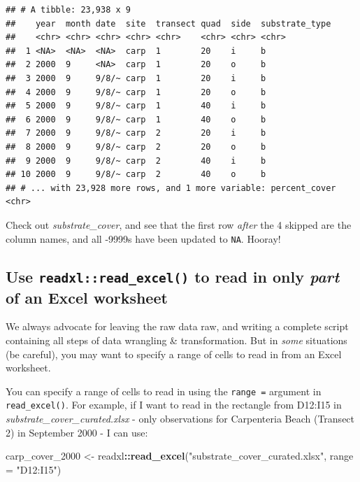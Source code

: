 \documentclass[]{book}
\newenvironment{Shaded}{\begin{snugshade}}{\end{snugshade}}
\newcommand{\DataTypeTok}[1]{\textcolor[rgb]{0.13,0.29,0.53}{#1}}
\newcommand{\DecValTok}[1]{\textcolor[rgb]{0.00,0.00,0.81}{#1}}
\newcommand{\KeywordTok}[1]{\textcolor[rgb]{0.13,0.29,0.53}{\textbf{#1}}}
\newcommand{\NormalTok}[1]{#1}
\newcommand{\OperatorTok}[1]{\textcolor[rgb]{0.81,0.36,0.00}{\textbf{#1}}}
\newcommand{\StringTok}[1]{\textcolor[rgb]{0.31,0.60,0.02}{#1}}
\begin{document}
\begin{verbatim}
## # A tibble: 23,938 x 9
##    year  month date  site  transect quad  side  substrate_type
##    <chr> <chr> <chr> <chr> <chr>    <chr> <chr> <chr>         
##  1 <NA>  <NA>  <NA>  carp  1        20    i     b             
##  2 2000  9     <NA>  carp  1        20    o     b             
##  3 2000  9     9/8/~ carp  1        20    i     b             
##  4 2000  9     9/8/~ carp  1        20    o     b             
##  5 2000  9     9/8/~ carp  1        40    i     b             
##  6 2000  9     9/8/~ carp  1        40    o     b             
##  7 2000  9     9/8/~ carp  2        20    i     b             
##  8 2000  9     9/8/~ carp  2        20    o     b             
##  9 2000  9     9/8/~ carp  2        40    i     b             
## 10 2000  9     9/8/~ carp  2        40    o     b             
## # ... with 23,928 more rows, and 1 more variable: percent_cover <chr>
\end{verbatim}

Check out \emph{substrate\_cover}, and see that the first row \emph{after} the 4 skipped are the column names, and all -9999s have been updated to \texttt{NA}. Hooray!

\hypertarget{use-readxlread_excel-to-read-in-only-part-of-an-excel-worksheet}{%
\subsection{\texorpdfstring{Use \texttt{readxl::read\_excel()} to read in only \emph{part} of an Excel worksheet}{Use readxl::read\_excel() to read in only part of an Excel worksheet}}\label{use-readxlread_excel-to-read-in-only-part-of-an-excel-worksheet}}

We always advocate for leaving the raw data raw, and writing a complete script containing all steps of data wrangling \& transformation. But in \emph{some} situations (be careful), you may want to specify a range of cells to read in from an Excel worksheet.

You can specify a range of cells to read in using the \texttt{range\ =} argument in \texttt{read\_excel()}. For example, if I want to read in the rectangle from D12:I15 in \emph{substrate\_cover\_curated.xlsx} - only observations for Carpenteria Beach (Transect 2) in September 2000 - I can use:

\begin{Shaded}
\begin{Highlighting}[]
\NormalTok{carp_cover_}\DecValTok{2000}\NormalTok{ <-}\StringTok{ }\NormalTok{readxl}\OperatorTok{::}\KeywordTok{read_excel}\NormalTok{(}\StringTok{"substrate_cover_curated.xlsx"}\NormalTok{, }\DataTypeTok{range =} \StringTok{"D12:I15"}\NormalTok{)}
\end{Highlighting}
\end{Shaded}
\end{document}
